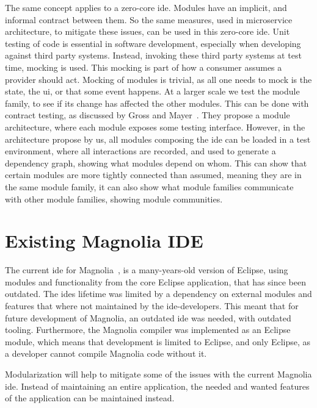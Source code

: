 The same concept applies to a zero-core \gls*{ide}. Modules have an implicit, and
informal contract between them. So the same measures, used in microservice
architecture, to mitigate these issues, can be used in this zero-core \gls*{ide}.
Unit testing of code is essential in software development, especially when
developing against third party systems. Instead, invoking these third party
systems at test time, mocking is used. This mocking is part of how a consumer
assumes a provider should act. Mocking of modules is trivial, as all one needs
to mock is the state, the \gls*{ui}, or that some event happens. At a larger
scale we test the module family, to see if its change has affected the other
modules. This can be done with contract testing, as discussed by Gross and Mayer~\cite{GROSS200322}.
They propose a module architecture, where each module exposes some testing
interface. However, in the architecture propose by us, all modules composing the
\gls*{ide} can be loaded in a test environment, where all interactions are
recorded, and used to generate a dependency graph, showing what modules depend
on whom. This can show that certain modules are more tightly connected than
assumed, meaning they are in the same module family, it can also show what
module families communicate with other module families, showing module
communities.

\section{Existing Magnolia IDE}

The current \gls*{ide} for Magnolia~\cite{baggeIde}, is a many-years-old version
of Eclipse, using modules and functionality from the core Eclipse application,
that has since been outdated. The \gls*{ide}s lifetime was limited by a
dependency on external modules and features that where not maintained by the
\gls*{ide}-developers. This meant that for future development of Magnolia, an
outdated \gls*{ide} was needed, with outdated tooling. Furthermore, the Magnolia
compiler was implemented as an Eclipse module, which means that development is
limited to Eclipse, and only Eclipse, as a developer cannot compile Magnolia
code without it.

Modularization will help to mitigate some of the issues with the current
Magnolia \gls*{ide}. Instead of maintaining an entire application, the needed and
wanted features of the application can be maintained instead.

